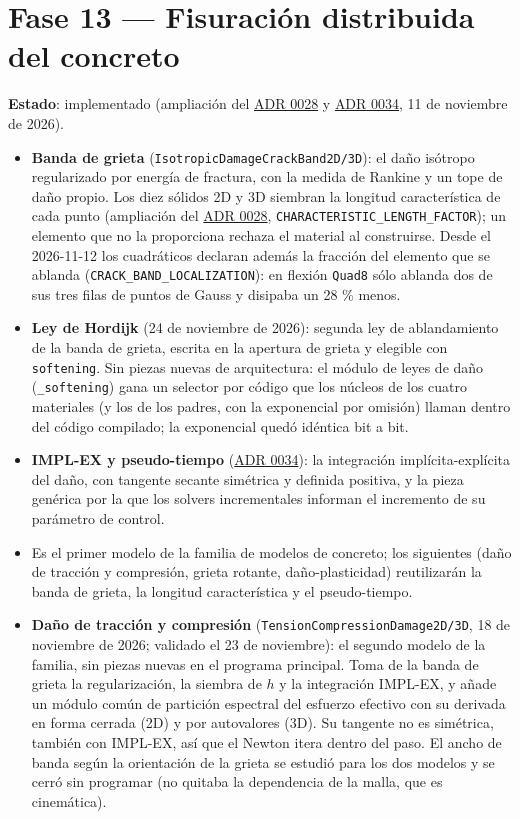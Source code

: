 \documentclass[11pt,oneside]{report}
\begin{document}
\section{Fase 13 --- Fisuración distribuida del concreto}

\textbf{Estado}: implementado (ampliación del \hyperref[adr:0028]{ADR 0028} y \hyperref[adr:0034]{ADR 0034}, 11 de noviembre de 2026).

\begin{itemize}
  \item \textbf{Banda de grieta} (\texttt{IsotropicDamageCrackBand2D/\allowbreak{}3D}): el daño isótropo regularizado por energía de fractura, con la medida de Rankine y un tope de daño propio. Los diez sólidos 2D y 3D siembran la longitud característica de cada punto (ampliación del \hyperref[adr:0028]{ADR 0028}, \texttt{CHARACTERISTIC\_\allowbreak{}LENGTH\_\allowbreak{}FACTOR}); un elemento que no la proporciona rechaza el material al construirse. Desde el 2026-11-12 los cuadráticos declaran además la fracción del elemento que se ablanda (\texttt{CRACK\_\allowbreak{}BAND\_\allowbreak{}LOCALIZATION}): en flexión \texttt{Quad8} sólo ablanda dos de sus tres filas de puntos de Gauss y disipaba un 28 \% menos.
  \item \textbf{Ley de Hordijk} (24 de noviembre de 2026): segunda ley de ablandamiento de la banda de grieta, escrita en la apertura de grieta y elegible con \texttt{softening}. Sin piezas nuevas de arquitectura: el módulo de leyes de daño (\texttt{\_softening}) gana un selector por código que los núcleos de los cuatro materiales (y los de los padres, con la exponencial por omisión) llaman dentro del código compilado; la exponencial quedó idéntica bit a bit.
  \item \textbf{IMPL-EX y pseudo-tiempo} (\hyperref[adr:0034]{ADR 0034}): la integración implícita-explícita del daño, con tangente secante simétrica y definida positiva, y la pieza genérica por la que los solvers incrementales informan el incremento de su parámetro de control.
  \item Es el primer modelo de la familia de modelos de concreto; los siguientes (daño de tracción y compresión, grieta rotante, daño-plasticidad) reutilizarán la banda de grieta, la longitud característica y el pseudo-tiempo.
  \item \textbf{Daño de tracción y compresión} (\texttt{TensionCompressionDamage2D/\allowbreak{}3D}, 18 de noviembre de 2026; validado el 23 de noviembre): el segundo modelo de la familia, sin piezas nuevas en el programa principal. Toma de la banda de grieta la regularización, la siembra de $h$ y la integración IMPL-EX, y añade un módulo común de partición espectral del esfuerzo efectivo con su derivada en forma cerrada (2D) y por autovalores (3D). Su tangente no es simétrica, también con IMPL-EX, así que el Newton itera dentro del paso. El ancho de banda según la orientación de la grieta se estudió para los dos modelos y se cerró sin programar (no quitaba la dependencia de la malla, que es cinemática).
\end{itemize}
\end{document}
